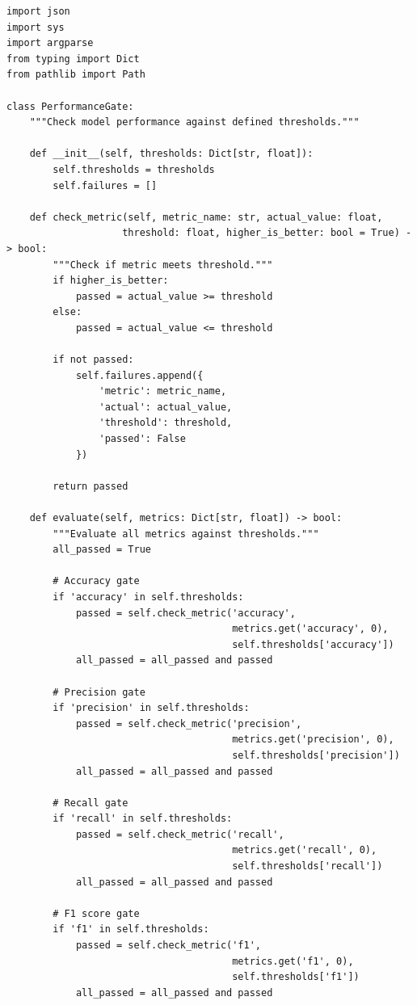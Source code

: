 \begin{lstlisting}[style=python, caption=scripts/check_performance_gates.py]
import json
import sys
import argparse
from typing import Dict
from pathlib import Path

class PerformanceGate:
    """Check model performance against defined thresholds."""

    def __init__(self, thresholds: Dict[str, float]):
        self.thresholds = thresholds
        self.failures = []

    def check_metric(self, metric_name: str, actual_value: float,
                    threshold: float, higher_is_better: bool = True) -> bool:
        """Check if metric meets threshold."""
        if higher_is_better:
            passed = actual_value >= threshold
        else:
            passed = actual_value <= threshold

        if not passed:
            self.failures.append({
                'metric': metric_name,
                'actual': actual_value,
                'threshold': threshold,
                'passed': False
            })

        return passed

    def evaluate(self, metrics: Dict[str, float]) -> bool:
        """Evaluate all metrics against thresholds."""
        all_passed = True

        # Accuracy gate
        if 'accuracy' in self.thresholds:
            passed = self.check_metric('accuracy',
                                       metrics.get('accuracy', 0),
                                       self.thresholds['accuracy'])
            all_passed = all_passed and passed

        # Precision gate
        if 'precision' in self.thresholds:
            passed = self.check_metric('precision',
                                       metrics.get('precision', 0),
                                       self.thresholds['precision'])
            all_passed = all_passed and passed

        # Recall gate
        if 'recall' in self.thresholds:
            passed = self.check_metric('recall',
                                       metrics.get('recall', 0),
                                       self.thresholds['recall'])
            all_passed = all_passed and passed

        # F1 score gate
        if 'f1' in self.thresholds:
            passed = self.check_metric('f1',
                                       metrics.get('f1', 0),
                                       self.thresholds['f1'])
            all_passed = all_passed and passed


\end{lstlisting}
